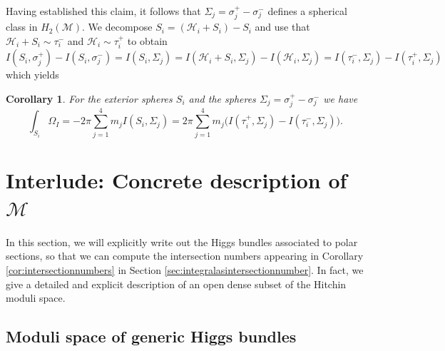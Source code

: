 \documentclass[12pt,letterpaper,reqno]{amsart}
\newtheorem{cor}[thm]{Corollary}
\theoremstyle{remark}
\theoremstyle{definition}
\numberwithin{thm}{section}
\numberwithin{equation}{section}
\numberwithin{figure}{section}
\newcommand{\calM}{\mathcal M}
\begin{document}
\medskip

Having established this claim, it follows that  $\Sigma_j = \sigma_j^+ - \sigma_j^-$ defines a spherical class in $H_2(\calM)$. We decompose  $S_i=(\mathcal{H}_i + S_i)-S_i$ and use that $ \mathcal{H}_i +S_i \sim \tau_i^- $ and $ \mathcal{H}_i \sim \tau_i^+ $ to obtain
\[
I(S_i,\sigma_j^+)- I(S_i,\sigma_j^-) =  I(S_i, \Sigma_j) = I(\mathcal{H}_i +S_i,\Sigma_j) - I(\mathcal{H}_i,\Sigma_j) = I (\tau_i^-, \Sigma_j) - I(\tau_i^+, \Sigma_j)
\]
which yields

\begin{cor}\label{cor:intersection_numbers} For the exterior spheres $S_i$ and the spheres $\Sigma_j = \sigma_j^+ - \sigma_j^-$ we have
\[
\int_{S_i} \Omega_I =  -2 \pi \sum_{j=1}^4 m_j  I(S_i, \Sigma_j)  =  2 \pi  \sum_{j=1}^4 m_j \bigl( I (\tau_i^+, \Sigma_j) - I(\tau_i^-, \Sigma_j)\bigr).
\]	
\end{cor}

\section{Interlude: Concrete description of \texorpdfstring{$\mathcal{M}$}{the Higgs bundle moduli space}}\label{sec:concrete}

In this section, we will explicitly write out the Higgs bundles associated to polar sections, so that we can compute the intersection numbers appearing in Corollary \ref{cor:intersectionnumbers} in Section \ref{sec:integralasintersectionnumber}. In fact, 
we give a detailed and explicit description of an open dense subset of the Hitchin moduli space. 


\subsection{Moduli space of generic Higgs bundles}
\label{eq:genericHiggs}
\end{document}
